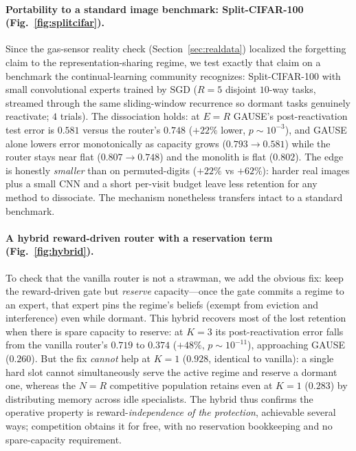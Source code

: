 \documentclass{article}
\begin{document}
\paragraph{Portability to a standard image benchmark: Split-CIFAR-100
(Fig.~\ref{fig:splitcifar}).} Since the gas-sensor reality check
(Section~\ref{sec:realdata}) localized the forgetting claim to the
representation-sharing regime, we test exactly that claim on a benchmark the
continual-learning community recognizes: Split-CIFAR-100 with small convolutional
experts trained by SGD ($R{=}5$ disjoint $10$-way tasks, streamed through the same
sliding-window recurrence so dormant tasks genuinely reactivate; $4$ trials). The
dissociation holds: at $E{=}R$ GAUSE's post-reactivation test error is $0.581$ versus
the router's $0.748$ ($+22\%$ lower, $p\sim10^{-3}$), and GAUSE alone lowers error
monotonically as capacity grows ($0.793\!\to\!0.581$) while the router stays near flat
($0.807\!\to\!0.748$) and the monolith is flat ($0.802$). The edge is honestly
\emph{smaller} than on permuted-digits ($+22\%$ vs $+62\%$): harder real images plus a
small CNN and a short per-visit budget leave less retention for any method to
dissociate. The mechanism nonetheless transfers intact to a standard benchmark.

\paragraph{A hybrid reward-driven router with a reservation term
(Fig.~\ref{fig:hybrid}).} To check that the vanilla router is not a strawman, we add
the obvious fix: keep the reward-driven gate but \emph{reserve} capacity---once the
gate commits a regime to an expert, that expert pins the regime's beliefs (exempt from
eviction and interference) even while dormant. This hybrid recovers most of the lost
retention when there is spare capacity to reserve: at $K{=}3$ its post-reactivation
error falls from the vanilla router's $0.719$ to $0.374$ ($+48\%$, $p\sim10^{-11}$),
approaching GAUSE ($0.260$). But the fix \emph{cannot} help at $K{=}1$
($0.928$, identical to vanilla): a single hard slot cannot simultaneously serve the
active regime and reserve a dormant one, whereas the $N{=}R$ competitive population
retains even at $K{=}1$ ($0.283$) by distributing memory across idle specialists. The
hybrid thus confirms the operative property is reward-\emph{independence of the
protection}, achievable several ways; competition obtains it for free, with no
reservation bookkeeping and no spare-capacity requirement.
\end{document}

